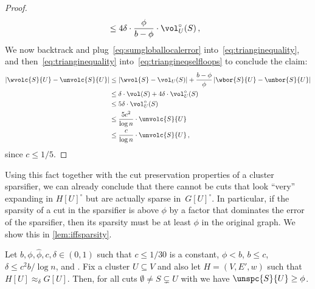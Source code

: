 \begin{proof}
\begin{align}
		& \le 4\delta\cdot\frac{\phi}{b-\phi} \cdot \vol_U^{\circ}(S) \, , \label{eq:sumgloballocalerror}
	\end{align}
We now backtrack and plug~\eqref{eq:sumgloballocalerror} into~\eqref{eq:trianginequality}, and then~\eqref{eq:trianginequality} into~\eqref{eq:triangineqselfloops} to conclude the claim:
	\begin{align*}
		\left|\wvolc{S}{U}- \unvolc{S}{U}\right| & \le \left|\wvol{S}- \vol_U(S)\right| + \frac{b-\phi}{\phi}\left|\wbor{S}{U} - \unbor{S}{U}\right| \\
		& \le \delta \cdot \vol(S) + 4\delta \cdot \vol_U^{\circ}(S) \\
		& \le 5\delta \cdot \vol_U^{\circ}(S) \\
		& \le \frac{5c^2}{\log n}\cdot \unvolc{S}{U} \\
		& \le \frac{c}{\log n}\cdot \unvolc{S}{U} \, ,
	\end{align*}
since $c \le 1/5$.
\end{proof}
\noindent
Using this fact together with the cut preservation properties of a cluster sparsifier, we can already conclude that there cannot be cuts that look ``very'' expanding in $H[U]^\circ$ but are actually sparse in~$G[U]^\circ$. In particular, if the sparsity of a cut in the sparsifier is above $\phi$ by a factor that dominates the error of the sparsifier, then its sparsity must be at least $\phi$ in the original graph. We show this in \cref{lem:iffsparsity}.
\begin{lemma}
	\label{lem:iffsparsity}
	Let $b, \phi,\hat{\phi}, c,\delta \in (0,1)$ such that $c \leq 1/30$ is a constant, $\phi < b$, $b \le c$, $\delta \le c^2 b/ \log n$, and .  Fix a cluster $U \subseteq V$ and also let $H=(V,E',w)$ such that $H[U] \approx_\delta G[U]$. Then, for all cuts $\emptyset \neq S \subsetneq U$ with  we have $\unspc{S}{U} \ge \phi$.
\end{lemma}
